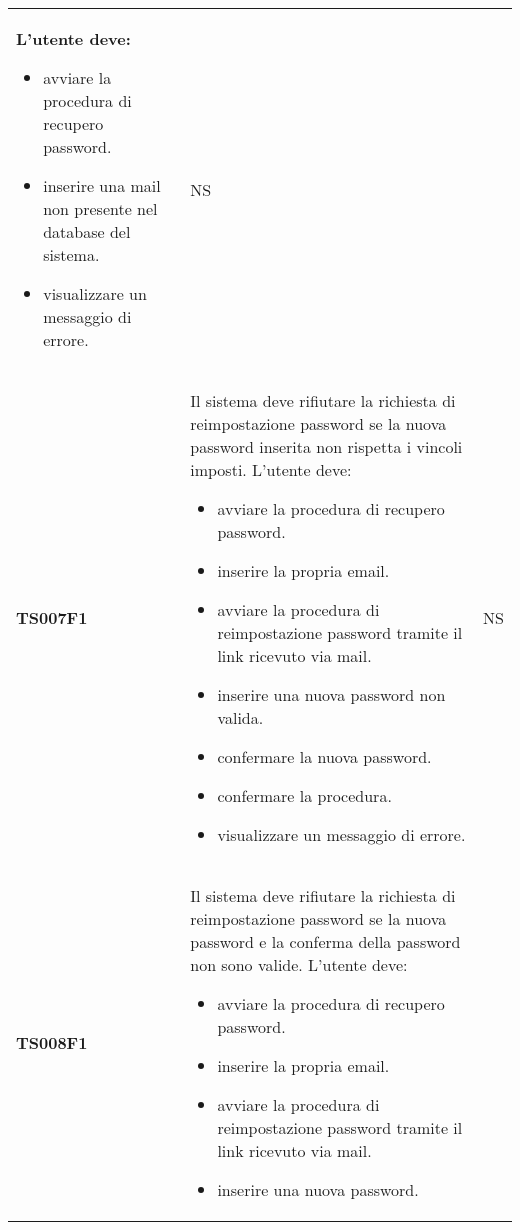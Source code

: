 \documentclass[../piano-di-qualifica.tex]{subfiles}
\begin{document}
\begin{centering}
\begin{longtable}[H]{>{\centering\bfseries}m{3cm} >{}p{10cm} >{\centering\arraybackslash}m{3cm}}
                      L'utente deve:
                      \begin{itemize}
                        \item avviare la procedura di recupero password.
                        \item inserire una mail non presente nel database del sistema.
                        \item visualizzare un messaggio di errore.
                      \end{itemize}
                    & NS \\
        TS007F1     & Il sistema deve rifiutare la richiesta di reimpostazione password se la nuova password inserita non rispetta i vincoli imposti. \newline
                      L'utente deve:
                      \begin{itemize}
                        \item avviare la procedura di recupero password.
                        \item inserire la propria email.
                        \item avviare la procedura di reimpostazione password tramite il link ricevuto via mail.
                        \item inserire una nuova password non valida.
                        \item confermare la nuova password.
                        \item confermare la procedura.
                        \item visualizzare un messaggio di errore.
                      \end{itemize}
                    & NS \\
        TS008F1     & Il sistema deve rifiutare la richiesta di reimpostazione password se la nuova password e la conferma della password non sono valide. \newline
                      L'utente deve:
                      \begin{itemize}
                        \item avviare la procedura di recupero password.
                        \item inserire la propria email.
                        \item avviare la procedura di reimpostazione password tramite il link ricevuto via mail.
                        \item inserire una nuova password.

\end{itemize}
\end{longtable}
\end{centering}
\end{document}
